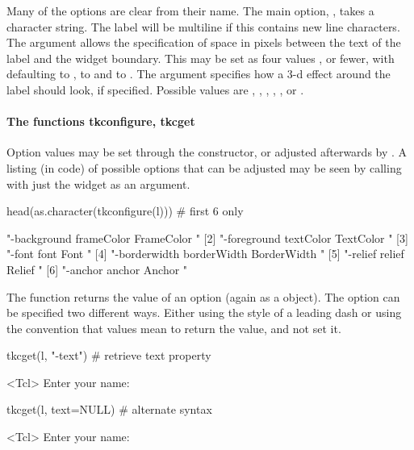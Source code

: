 Many of the options are clear from their name.  The main option,
, takes a character string. The label will be multiline if
this contains new line characters.  The 
argument allows the specification of space in pixels between the text
of the label and the widget boundary. This may be set as four values
, or fewer, with 
defaulting to ,  to  and 
to . The  argument specifies how
a 3-d effect around the label should look, if specified. Possible
values are , , ,
, , or .

\paragraph{The functions tkconfigure, tkcget}
Option values may be set through the constructor, or adjusted
afterwards by . A listing (in \TCL\/ code) of possible options
that can be adjusted may be seen by calling 
with just the widget as an argument.

\begin{Schunk}
\begin{Sinput}
 head(as.character(tkconfigure(l)))      # first 6 only
\end{Sinput}
\begin{Soutput}
[1] "-background frameColor FrameColor {} {}"   
[2] "-foreground textColor TextColor {} {}"     
[3] "-font font Font {} {}"                     
[4] "-borderwidth borderWidth BorderWidth {} {}"
[5] "-relief relief Relief {} {}"               
[6] "-anchor anchor Anchor {} {}"               
\end{Soutput}
\end{Schunk}

The  function returns the value of an
option (again as a  object). The option can be specified
two different ways. Either using the \TK\/ style of a leading dash or
using the \R{} convention that  values mean to return the value,
and not set it.


\begin{Schunk}
\begin{Sinput}
 tkcget(l, "-text")                   # retrieve text property
\end{Sinput}
\begin{Soutput}
<Tcl> Enter your name: 
\end{Soutput}
\begin{Sinput}
 tkcget(l, text=NULL)                 # alternate syntax
\end{Sinput}
\begin{Soutput}
<Tcl> Enter your name: 
\end{Soutput}
\end{Schunk}

